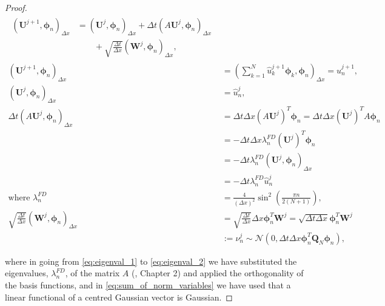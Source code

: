 \begin{proof}
\begin{align}
    \begin{split}
        (\mathbf{U}^{j+1}, \boldsymbol{\phi}_n)_{\Delta x} &= 
        (\mathbf{U}^j, \boldsymbol{\phi}_n)_{\Delta x} + 
        \Delta t (A \mathbf{U}^j, \boldsymbol{\phi}_n)_{\Delta x}
        \label{eq:inner_product_var_res}
        \\
        &\qquad + \sqrt{\frac{\Delta t}{\Delta x}} 
        (\mathbf{W}^j, \boldsymbol{\phi}_n)_{\Delta x},
    \end{split}\\
    (\mathbf{U}^{j+1}, \boldsymbol{\phi}_n)_{\Delta x} &=
    \left(\sum_{k=1}^{N} \hat{u}_k^{j+1} \boldsymbol{\phi}_k, 
    \boldsymbol{\phi}_n\right)_{\Delta x} = 
    \hat{u}_n^{j+1}, 
    \nonumber
    \\
    (\mathbf{U}^j, \boldsymbol{\phi}_n)_{\Delta x} &= \hat{u}_n^j, 
    \nonumber
    \\
    \Delta t (A \mathbf{U}^j, \boldsymbol{\phi}_n)_{\Delta x} &= 
    \Delta t \Delta x (A \mathbf{U}^j)^T \boldsymbol{\phi}_n = 
    \Delta t \Delta x (\mathbf{U}^j)^T A \boldsymbol{\phi}_n
    \label{eq:eigenval_1}\\
    &= -\Delta t \Delta x \lambda_n^{FD}(\mathbf{U}^j)^T \boldsymbol{\phi}_n 
    \nonumber
    \\
    &= -\Delta t \lambda_n^{FD} (\mathbf{U}^j, \boldsymbol{\phi}_n)_{\Delta x}
    \nonumber
    \\
    &= -\Delta t \lambda_n^{FD} \hat{u}_n^j
     \label{eq:eigenval_2}\\
     \text{where }\lambda_n^{FD}&= \frac{4}{(\Delta x)^2} 
     \sin^2(\frac{\pi n}{2(N+1)}),
     \nonumber
     \\
    \sqrt{\frac{\Delta t}{\Delta x}}
    (\mathbf{W}^j, \boldsymbol{\phi}_n)_{\Delta x} &= 
    \sqrt{\frac{\Delta t}{\Delta x}} \Delta x \boldsymbol{\phi}_n^T \mathbf{W}^j = 
    \sqrt{\Delta t \Delta x} \boldsymbol{\phi}_n^T \mathbf{W}^j
    \nonumber
    \\
    &:= \nu_n^j 
    \sim \mathcal{N}(0, 
    \Delta t \Delta x \boldsymbol{\phi}_n^T \mathbf{Q}_N \boldsymbol{\phi}_n),
    \label{eq:sum_of_norm_variables}
\end{align}

where in going from \eqref{eq:eigenval_1} to \eqref{eq:eigenval_2}
we have substituted the eigenvalues, $\lambda_n^{FD}$, of the matrix 
$A$ (\cite{strang2007computational}, Chapter 2) and applied the orthogonality
of the basis functions, and in 
\eqref{eq:sum_of_norm_variables} we have 
used that a linear functional of a centred Gaussian vector is Gaussian.


\end{proof}
